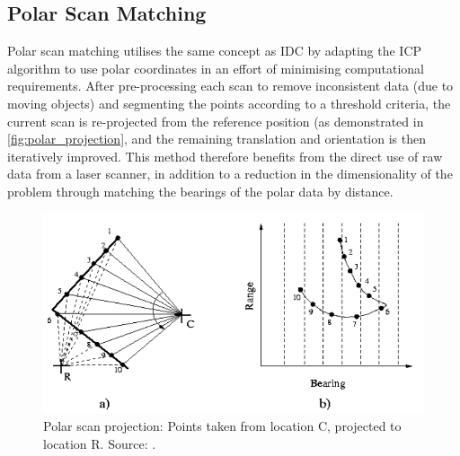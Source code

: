 \documentclass[authoryearcitations]{UoYCSproject}
\begin{document}
\subsection{Polar Scan Matching}
\label{subsec:psm}
Polar scan matching \citet{Diosi2005-nv} utilises the same concept as IDC by adapting the ICP algorithm to use polar coordinates in an effort of minimising computational requirements. After pre-processing each scan to remove inconsistent data (due to moving objects) and segmenting the points according to a threshold criteria, the current scan is re-projected from the reference position (as demonstrated in \autoref{fig:polar_projection}, and the remaining translation and orientation is then iteratively improved. This method therefore benefits from the direct use of raw data from a laser scanner, in addition to a reduction in the dimensionality of the problem through matching the bearings of the polar data by distance. 

\begin{figure}[t]
	\centering
	\includegraphics[width=\textwidth,keepaspectratio]{images/polar_projection.png}
	\caption{Polar scan projection: Points taken from location C, projected to location R. Source: \citet{Diosi2005-nv}.}
	\label{fig:polar_projection}
\end{figure}
\end{document}
